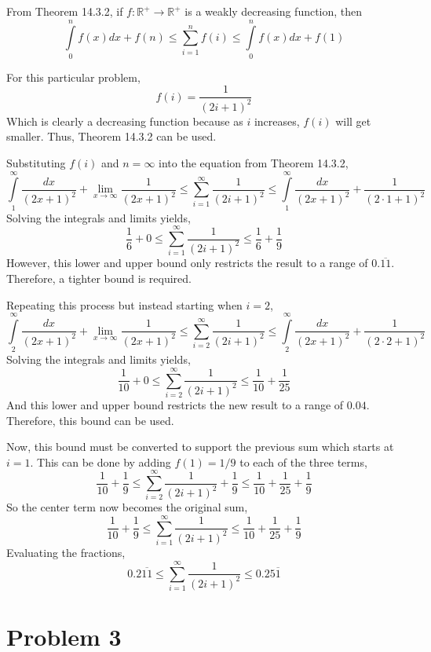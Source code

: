 \documentclass{article}
\begin{document}
\bigbreak

From Theorem 14.3.2, if $f: \mathbb{R}^+ \rightarrow \mathbb{R}^+$ is a weakly
decreasing function, then
$$ \int\limits_0^n f(x) dx + f(n) \leq \sum\limits_{i=1}^{n} f(i) \leq
\int\limits_0^n f(x) dx + f(1) $$

For this particular problem,
$$ f(i) = \frac{1}{(2i + 1)^2} $$
Which is clearly a decreasing function because as $i$ increases, $f(i)$ will get
smaller. Thus, Theorem 14.3.2 can be used.

Substituting $f(i)$ and $n = \infty$ into the equation from Theorem 14.3.2,
$$ \int\limits_1^\infty \frac{dx}{(2x + 1)^2} + \lim_{x \to \infty} \frac{1}{(2x
+ 1)^2} \leq \sum\limits_{i=1}^{\infty} \frac{1}{(2i + 1)^2} \leq
\int\limits_1^\infty \frac{dx}{(2x + 1)^2} + \frac{1}{(2 \cdot 1 + 1)^2} $$
Solving the integrals and limits yields,
$$ \frac{1}{6} + 0 \leq \sum\limits_{i=1}^{\infty} \frac{1}{(2i + 1)^2} \leq
\frac{1}{6} + \frac{1}{9} $$
However, this lower and upper bound only restricts the result to a range of
$0.\overline{11}$. Therefore, a tighter bound is required.

Repeating this process but instead starting when $i = 2$,
$$ \int\limits_2^\infty \frac{dx}{(2x + 1)^2} + \lim_{x \to \infty} \frac{1}{(2x
+ 1)^2} \leq \sum\limits_{i=2}^{\infty} \frac{1}{(2i + 1)^2} \leq
\int\limits_2^\infty \frac{dx}{(2x + 1)^2} + \frac{1}{(2 \cdot 2 + 1)^2} $$
Solving the integrals and limits yields,
$$ \frac{1}{10} + 0 \leq \sum\limits_{i=2}^{\infty} \frac{1}{(2i + 1)^2} \leq
\frac{1}{10} + \frac{1}{25} $$
And this lower and upper bound restricts the new result to a range of $0.04$.
Therefore, this bound can be used.

Now, this bound must be converted to support the previous sum which starts at $i
= 1$. This can be done by adding $f(1) = 1/9$ to each of the three terms,
$$ \frac{1}{10} + \frac{1}{9} \leq \sum\limits_{i=2}^{\infty} \frac{1}{(2i +
1)^2} + \frac{1}{9} \leq \frac{1}{10} + \frac{1}{25} + \frac{1}{9} $$
So the center term now becomes the original sum,
$$ \frac{1}{10} + \frac{1}{9} \leq \sum\limits_{i=1}^{\infty} \frac{1}{(2i +
1)^2} \leq \frac{1}{10} + \frac{1}{25} + \frac{1}{9} $$
Evaluating the fractions,
$$ 0.2\overline{11} \leq \sum\limits_{i=1}^{\infty} \frac{1}{(2i + 1)^2} \leq
0.25\overline{1} $$

\break

\section*{Problem 3}
\end{document}
